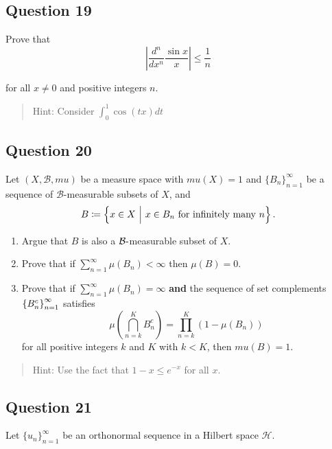 \documentclass[12pt]{article}
\begin{document}
\hypertarget{question-19-1}{%
\subsection{Question 19}\label{question-19-1}}

Prove that \[
\left|\frac{d^{n}}{d x^{n}} \frac{\sin x}{x}\right| \leq \frac{1}{n}
\]

for all \(x \neq 0\) and positive integers \(n\).

\begin{quote}
Hint: Consider \(\displaystyle\int_0^1 \cos(tx) dt\)
\end{quote}

\hypertarget{question-20-1}{%
\subsection{Question 20}\label{question-20-1}}

Let \((X, \mathcal B, mu)\) be a measure space with \(mu(X) = 1\) and
\(\{B_n\}_{n=1}^\infty\) be a sequence of \(\mathcal B\)-measurable
subsets of \(X\), and \[
B \coloneqq \left\{{x\in X {~\mathrel{\Big|}~} x\in B_n \text{ for infinitely many } n}\right\}.
\]

\begin{enumerate}
\def\labelenumi{\alph{enumi}.}
\item
  Argue that \(B\) is also a \(\mathcal{B} {\hbox{-}}\)measurable subset of
  \(X\).
\item
  Prove that if \(\sum_{n=1}^\infty \mu(B_n) < \infty\) then
  \(\mu(B)= 0\).
\item
  Prove that if \(\sum_{n=1}^\infty \mu(B_n) = \infty\) \textbf{and} the
  sequence of set complements \(\left\{{B_n^c}\right\}_{n=1}^\infty\) satisfies
  \[
  \mu\left(\bigcap_{n=k}^{K} B_{n}^{c}\right)=\prod_{n=k}^{K}\left(1-\mu\left(B_{n}\right)\right)
  \] for all positive integers \(k\) and \(K\) with \(k < K\), then
  \(mu(B) = 1\).
\end{enumerate}

\begin{quote}
Hint: Use the fact that \(1 - x \leq e^{-x}\) for all \(x\).
\end{quote}

\hypertarget{question-21-1}{%
\subsection{Question 21}\label{question-21-1}}

Let \(\{u_n\}_{n=1}^\infty\) be an orthonormal sequence in a Hilbert
space \(\mathcal{H}\).
\end{document}
